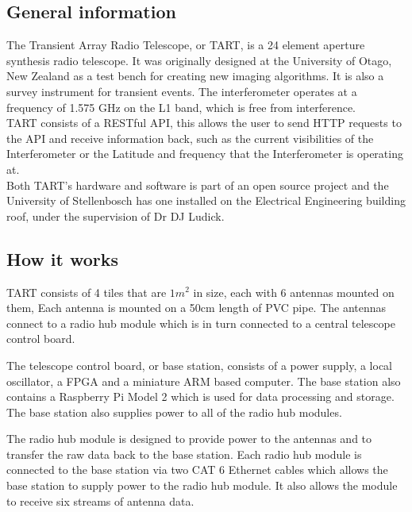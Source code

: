 \subsection{General information}
The Transient Array Radio Telescope, or TART, is a 24 element aperture synthesis radio telescope. It was originally designed at the University of Otago, New Zealand as a test bench for creating new imaging algorithms. It is also a survey instrument for transient events\cite{DESIGN_TART}. The interferometer operates at a frequency of 1.575 GHz on the L1 band, which is free from interference.
\\
TART consists of a RESTful API, this allows the user to send HTTP requests to the API and receive information back, such as the current visibilities of the Interferometer or the Latitude and frequency that the Interferometer is operating at.\cite{CALIBRATION_TART}\\
Both TART's hardware and software is part of an open source project and the University of Stellenbosch has one installed on the Electrical Engineering building roof, under the supervision of Dr DJ Ludick.

\subsection{How it works}
TART consists of 4 tiles that are $1m^2$ in size, each with 6 antennas mounted on them, Each antenna is mounted on a 50cm length of PVC pipe. The antennas connect to a radio hub module which is in turn connected to a central telescope control board\cite{LAYOUT_TART}.

The telescope control board, or base station, consists of a power supply, a local oscillator, a FPGA and a miniature ARM based computer. The base station also contains a Raspberry Pi Model 2 which is used for data processing and storage. The base station also supplies power to all of the radio hub modules\cite{CALIBRATION_AND_SYNTHESIS_TART}.

The radio hub module is designed to provide power to the antennas and to transfer the raw data back to the base station. Each radio hub module is connected to the base station via two CAT 6 Ethernet cables which allows the base station to supply power to the radio hub module. It also  allows the module to receive six streams of antenna data\cite{CALIBRATION_AND_SYNTHESIS_TART}.


